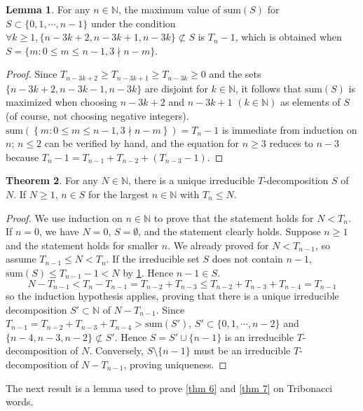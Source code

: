 \documentclass{article}
\theoremstyle{definition}
\newtheorem{theorem}{Theorem}
\newtheorem{lemma}[theorem]{Lemma}
\begin{document}
\begin{lemma}
\label{lemma}
For any $n\in \mathbb{N}$, the maximum value of $\text{sum}(S)$ for $S\subset\{0,1,\cdots,n-1\}$ under the condition $\forall k\geq 1,  \{n-3k+2, n-3k+1, n-3k\}\not\subset S$ is $T_n-1$, which is obtained when $S=\{m: 0\leq m\leq n-1, 3\nmid n-m\}$.
\end{lemma}
\begin{proof}
Since
\(
  T_{n-3k+2} \geq T_{n-3k+1} \geq T_{n-3k}\geq0
\)
and the sets
\(
  \{n-3k+2, n-3k-1, n-3k\}
\)
are disjoint for \( k \in \mathbb{N} \), it follows that $\text{sum}(S)$ is maximized when choosing $n-3k+2$ and $n-3k+1$ $(k\in \mathbb{N})$ as elements of $S$ (of course, not choosing negative integers). $\text{sum} \left(\left\{m: 0\leq m\leq n-1, 3\nmid n-m\right\} \right)=T_n-1$ is immediate from induction on $n$; $n\leq2$ can be verified by hand, and the equation for $n\geq3$ reduces to $n-3$ because $T_n-1=T_{n-1}+T_{n-2}+\left(T_{n-3}-1 \right)$. 
\end{proof}

\begin{theorem}
\label{thm 1} For any $N\in \mathbb{N}$, there is a unique irreducible $T$-decomposition $S$ of $N$. If $N\geq 1$, $n\in S$ for the largest $n\in \mathbb{N}$ with $T_n \leq N$.
\end{theorem}

\begin{proof}
We use induction on $n\in\mathbb{N}$ to prove that the statement holds for $N<T_{n}$. If $n=0$, we have $N=0$, $S=\emptyset$, and the statement clearly holds. Suppose $n\geq 1$ and the statement holds for smaller $n$. We already proved for $N<T_{n-1}$, so assume $T_{n-1}\leq N<T_n$. If the irreducible set $S$ does not contain $n-1$, $\text{sum}(S)\leq T_{n-1}-1<N$ by \cref{lemma}. Hence $n-1\in S$.
\[
N-T_{n-1}<T_n-T_{n-1}=T_{n-2}+T_{n-3}\leq T_{n-2}+T_{n-3}+T_{n-4}=T_{n-1}
\]
so the induction hypothesis applies, proving that there is a unique irreducible decomposition $S'\subset\mathbb{N}$ of $N-T_{n-1}$. Since $T_{n-1}=T_{n-2}+T_{n-3}+T_{n-4}>\text{sum}(S')$, $S'\subset\{0,1,\cdots,n-2\}$ and $\{n-4, n-3, n-2\}\not\subset S'$. Hence $S=S'\cup\{n-1\}$ is an irreducible $T$-decomposition of $N$. Conversely, $S\setminus\{n-1\}$ must be an irreducible $T$-decomposition of $N-T_{n-1}$, proving uniqueness.  
\end{proof}

The next result is a lemma used to prove \cref{thm 6} and \cref{thm 7} on Tribonacci words.
\end{document}
